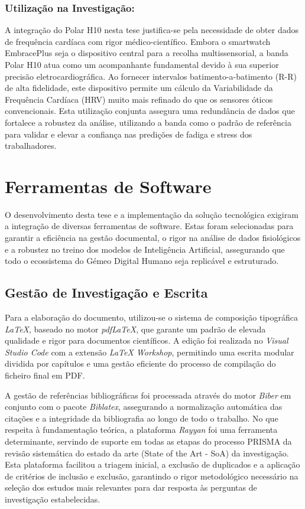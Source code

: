 \subsubsection*{Utilização na Investigação:}

A integração do Polar H10 nesta tese justifica-se pela necessidade de obter dados de frequência cardíaca com rigor médico-científico. Embora o smartwatch EmbracePlus seja o dispositivo central para a recolha multissensorial, a banda Polar H10 atua como um acompanhante fundamental devido à sua superior precisão eletrocardiográfica. Ao fornecer intervalos batimento-a-batimento (R-R) de alta fidelidade, este dispositivo permite um cálculo da Variabilidade da Frequência Cardíaca (HRV) muito mais refinado do que os sensores óticos convencionais. Esta utilização conjunta assegura uma redundância de dados que fortalece a robustez da análise, utilizando a banda como o padrão de referência para validar e elevar a confiança nas predições de fadiga e stress dos trabalhadores.
\section{Ferramentas de Software}
\label{sec:software}
O desenvolvimento desta tese e a implementação da solução tecnológica exigiram a integração de diversas ferramentas de software. Estas foram selecionadas para garantir a eficiência na gestão documental, o rigor na análise de dados fisiológicos e a robustez no treino dos modelos de Inteligência Artificial, assegurando que todo o ecossistema do Gémeo Digital Humano seja replicável e estruturado.

\subsection{Gestão de Investigação e Escrita}
Para a elaboração do documento, utilizou-se o sistema de composição tipográfica \textit{LaTeX}, baseado no motor \textit{pdfLaTeX}, que garante um padrão de elevada qualidade e rigor para documentos científicos. A edição foi realizada no \textit{Visual Studio Code} com a extensão \textit{LaTeX Workshop}, permitindo uma escrita modular dividida por capítulos e uma gestão eficiente do processo de compilação do ficheiro final em PDF.

A gestão de referências bibliográficas foi processada através do motor \textit{Biber} em conjunto com o pacote \textit{Biblatex}, assegurando a normalização automática das citações e a integridade da bibliografia ao longo de todo o trabalho. No que respeita à fundamentação teórica, a plataforma \textit{Rayyan} foi uma ferramenta determinante, servindo de suporte em todas as etapas do processo PRISMA da revisão sistemática do estado da arte (State of the Art - SoA) da investigação. Esta plataforma facilitou a triagem inicial, a exclusão de duplicados e a aplicação de critérios de inclusão e exclusão, garantindo o rigor metodológico necessário na seleção dos estudos mais relevantes para dar resposta às perguntas de investigação estabelecidas.


